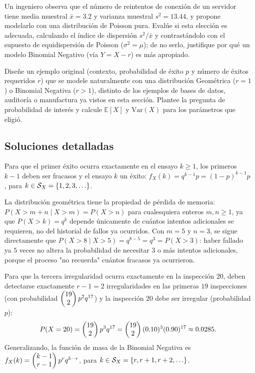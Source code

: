 \begin{problema}
	\label{prob:ca5c4c8}
	Un ingeniero observa que el número de reintentos de conexión de un servidor tiene media muestral $\bar{x}=3.2$ y varianza muestral $s^2=13.44$, y propone modelarlo con una distribución de Poisson pura. Evalúe si esta elección es adecuada, calculando el índice de dispersión $s^2/\bar{x}$ y contrastándolo con el supuesto de equidispersión de Poisson ($\sigma^2=\mu$); de no serlo, justifique por qué un modelo Binomial Negativo (vía $Y=X-r$) es más apropiado.
\end{problema}

\begin{problema}
	\label{prob:4c2c37d}
	Diseñe un ejemplo original (contexto, probabilidad de éxito $p$ y número de éxitos requeridos $r$) que se modele naturalmente con una distribución Geométrica ($r=1$) o Binomial Negativa ($r>1$), distinto de los ejemplos de bases de datos, auditoría o manufactura ya vistos en esta sección. Plantee la pregunta de probabilidad de interés y calcule $\mathbb{E}[X]$ y $\text{Var}(X)$ para los parámetros que eligió.
\end{problema}

\subsection*{Soluciones detalladas}

\begin{solproblema}
	Para que el primer éxito ocurra exactamente en el ensayo $k \ge 1$, los primeros $k-1$ deben ser fracasos y el ensayo $k$ un éxito: $f_X(k) = q^{k-1}p = (1-p)^{k-1}p$, para $k \in \mathcal{S}_X = \set{1,2,3,\dots}$.
\end{solproblema}

\begin{solproblema}
	La distribución geométrica tiene la propiedad de pérdida de memoria: $P(X > m+n \mid X>m) = P(X>n)$ para cualesquiera enteros $m,n\ge1$, ya que $P(X>k)=q^k$ depende únicamente de cuántos intentos adicionales se requieren, no del historial de fallos ya ocurridos. Con $m=5$ y $n=3$, se sigue directamente que $P(X>8\mid X>5) = q^{8-5} = q^3 = P(X>3)$: haber fallado ya $5$ veces no altera la probabilidad de necesitar $3$ o más intentos adicionales, porque el proceso "no recuerda" cuántos fracasos ya ocurrieron.
\end{solproblema}

\begin{solproblema}
	Para que la tercera irregularidad ocurra exactamente en la inspección $20$, deben detectarse exactamente $r-1=2$ irregularidades en las primeras $19$ inspecciones (con probabilidad $\begin{pmatrix} 19 \\ 2\end{pmatrix}p^2q^{17}$) y la inspección $20$ debe ser irregular (probabilidad $p$):
	\begin{align*}
		P(X=20) = \begin{pmatrix} 19 \\ 2\end{pmatrix}p^3q^{17} = \begin{pmatrix} 19 \\ 2\end{pmatrix}(0.10)^3(0.90)^{17} \approx 0.0285.
	\end{align*}
	Generalizando, la función de masa de la Binomial Negativa es $f_X(k) = \begin{pmatrix} k-1 \\ r-1\end{pmatrix}p^r q^{k-r}$, para $k \in \mathcal{S}_X = \set{r, r+1, r+2, \dots}$.
\end{solproblema}

